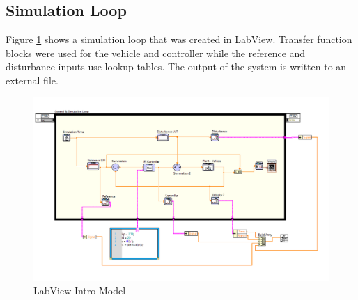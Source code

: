 \documentclass[11pt,titlepage]{article}
\begin{document}
    \subsection{Simulation Loop}
        Figure \ref{fig:sim_intro} shows a simulation loop that was created in LabView. Transfer function blocks were used for the vehicle and controller while the reference and disturbance inputs use lookup tables. The output of the system is written to an external file.
        \begin{figure}[h!]
            \centering
            \includegraphics[scale=.5]{labviewIntro}
            \caption{LabView Intro Model}
            \label{fig:sim_intro}
        \end{figure}
\end{document}
